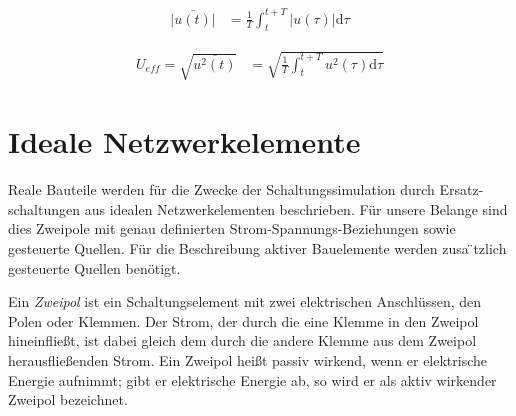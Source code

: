 \documentclass[
  ngerman,
  letterpaper,
]{scrbook}
\begin{document}
\begin{tcolorbox}[enhanced jigsaw, titlerule=0mm, rightrule=.15mm, toprule=.15mm, colback=white, toptitle=1mm, bottomrule=.15mm, coltitle=black, leftrule=.75mm, arc=.35mm, colbacktitle=quarto-callout-note-color!10!white, opacityback=0, bottomtitle=1mm, colframe=quarto-callout-note-color-frame, opacitybacktitle=0.6, breakable, title=\textcolor{quarto-callout-note-color}{\faInfo}\hspace{0.5em}{Gleichrichtmittelwert}, left=2mm]

\begin{align}
\overline{\lvert u(t) \lvert} &= \frac{1}{T} \int_t^{t+T} \lvert u(\tau) \lvert \mathrm{d} \tau
\end{align}

\end{tcolorbox}

\begin{tcolorbox}[enhanced jigsaw, titlerule=0mm, rightrule=.15mm, toprule=.15mm, colback=white, toptitle=1mm, bottomrule=.15mm, coltitle=black, leftrule=.75mm, arc=.35mm, colbacktitle=quarto-callout-note-color!10!white, opacityback=0, bottomtitle=1mm, colframe=quarto-callout-note-color-frame, opacitybacktitle=0.6, breakable, title=\textcolor{quarto-callout-note-color}{\faInfo}\hspace{0.5em}{Quadratischer Mittelwert - Effektivwert}, left=2mm]

\begin{align}
U_{eff} = \sqrt{\overline{u^2(t)}} &= \sqrt{\frac{1}{T} \int_t^{t+T} u^2(\tau) \mathrm{d} \tau}
\end{align}

\end{tcolorbox}

\section{Ideale Netzwerkelemente}\label{ideale-netzwerkelemente}

Reale Bauteile werden für die Zwecke der Schaltungssimulation durch
Ersatz- schaltungen aus idealen Netzwerkelementen beschrieben. Für
unsere Belange sind dies Zweipole mit genau definierten
Strom-Spannungs-Beziehungen sowie gesteuerte Quellen. Für die
Beschreibung aktiver Bauelemente werden zusa ̈tzlich gesteuerte Quellen
benötigt.

Ein \emph{Zweipol} ist ein Schaltungselement mit zwei elektrischen
Anschlüssen, den Polen oder Klemmen. Der Strom, der durch die eine
Klemme in den Zweipol hineinfließt, ist dabei gleich dem durch die
andere Klemme aus dem Zweipol herausfließenden Strom. Ein Zweipol heißt
passiv wirkend, wenn er elektrische Energie aufnimmt; gibt er
elektrische Energie ab, so wird er als aktiv wirkender Zweipol
bezeichnet.
\end{document}
